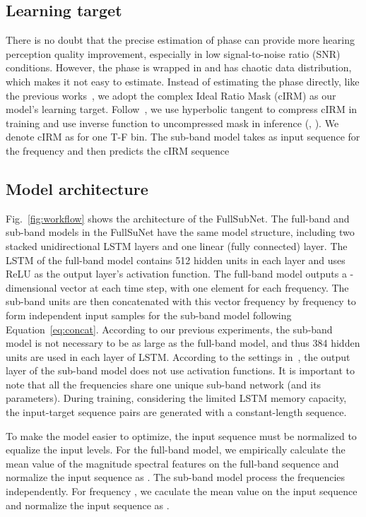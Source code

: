 \documentclass{article}
\begin{document}
\subsection{Learning target}
\label{sec:learning_target}
There is no doubt that the precise estimation of phase can provide more hearing perception quality improvement, especially in low signal-to-noise ratio (SNR) conditions.
However, the phase is wrapped in  and has chaotic data distribution, which makes it not easy to estimate.
Instead of estimating the phase directly, like the previous works~\cite{li_narrow-band_2019,sub_dns_xiaofeili}, we adopt the complex Ideal Ratio Mask (cIRM) as our model's learning target. 
Follow~\cite{cIRM}, we use hyperbolic tangent to compress cIRM in training and use inverse function to uncompressed mask in inference (, ).
We denote cIRM as  for one T-F bin.
The sub-band model takes as input sequence  for the frequency  and then predicts the cIRM sequence


\subsection{Model architecture}
Fig.~\ref{fig:workflow} shows the architecture of the FullSubNet.
The full-band and sub-band models in the FullSuNet have the same model structure, including two stacked unidirectional LSTM layers and one linear (fully connected) layer.
The LSTM of the full-band model contains 512 hidden units in each layer and uses ReLU as the output layer's activation function.
The full-band model outputs a -dimensional vector at each time step, with one element for each frequency. The sub-band units are then concatenated with this vector frequency by frequency to form  independent input samples for the sub-band model following Equation~\ref{eq:concat}.
According to our previous experiments, the sub-band model is not necessary to be as large as the full-band model, and thus 384 hidden units are used in each layer of LSTM. According to the settings in~\cite{cIRM}, the output layer of the sub-band model does not use activation functions.
It is important to note that all the frequencies share one unique sub-band network (and its parameters).
During training, considering the limited LSTM memory capacity, the input-target sequence pairs are generated with a constant-length sequence.

To make the model easier to optimize, the input sequence must be normalized to equalize the input levels.
For the full-band model, we empirically calculate the mean value  of the magnitude spectral features on the full-band sequence  and normalize the input sequence as .
The sub-band model process the frequencies independently.
For frequency , we caculate the mean value  on the input sequence  and normalize the input sequence as .
\end{document}
